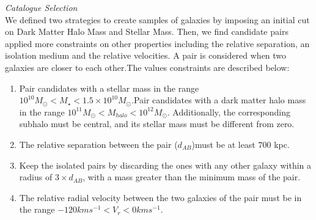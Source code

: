 \documentclass[fleqn,usenatbib]{mnras}
\begin{document}
\textit{Catalogue Selection}\\
We defined two strategies to create samples of galaxies by imposing an initial cut on Dark Matter Halo Mass and Stellar Mass. %
Then, we find candidate pairs applied more constraints on other properties including the relative separation, an isolation medium and the relative velocities. A pair is considered when two galaxies are closer to each other.The values constraints are described below:
\begin{enumerate}[i]
  \item Pair candidates with a stellar mass in the range $10^{10}M_\odot <M_\star<1.5\times 10^{10}M_\odot$.Pair candidates with a dark matter halo mass in the range $10^{11}M_\odot<M_{halo}<10^{12}M_\odot$. Additionally, the corresponding subhalo must be central, and its stellar mass must be different from zero. 
  \item The relative separation between the pair ($d_{AB}$)must be at least $700$ kpc. 
  \item Keep the isolated pairs by discarding the ones with any other galaxy within a radius of $3\times d_{AB}$, with a mass greater than the minimum mass of the pair. 
  \item The relative radial velocity between the two galaxies of the pair must be in the range $-120 km s^{-1}<V_r<0 km s^{-1}$. 
\end{enumerate}
\end{document}
